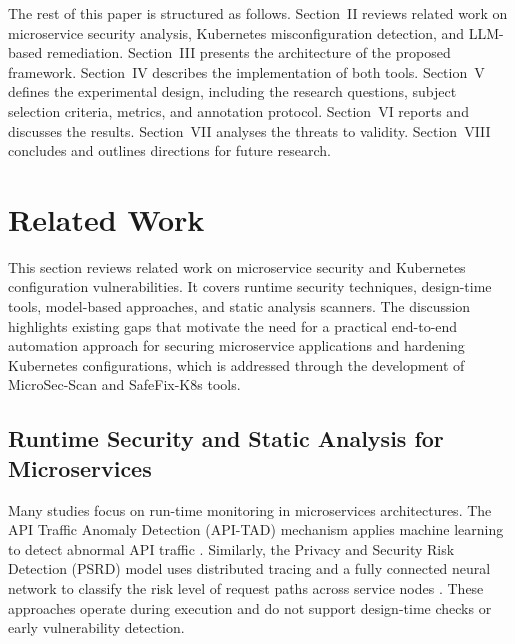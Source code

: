 \documentclass[preprint,12pt]{elsarticle}
\newcommand{\new}[1]{#1}
\begin{document}
\new{The rest of this paper is structured as follows. Section~II reviews related work on microservice security analysis, Kubernetes misconfiguration detection, and LLM-based remediation. Section~III presents the architecture of the proposed framework. Section~IV describes the implementation of both tools. Section~V defines the experimental design, including the research questions, subject selection criteria, metrics, and annotation protocol. Section~VI reports and discusses the results. Section~VII analyses the threats to validity. Section~VIII concludes and outlines directions for future research.}


















\section{Related Work}
\label{sec:lit_gap}

This section reviews related work on microservice security and Kubernetes configuration vulnerabilities. It covers runtime security techniques, design-time tools, model-based approaches, and static analysis scanners. The discussion highlights existing gaps that motivate the need for a practical end-to-end automation approach for securing microservice applications and hardening Kubernetes configurations, which is addressed through the development of MicroSec-Scan and SafeFix-K8s tools.



\subsection{Runtime Security and Static Analysis for Microservices}



Many studies focus on run-time monitoring in microservices architectures. The API Traffic Anomaly Detection (API-TAD) mechanism applies machine learning to detect abnormal API traffic \cite{sowmya2023apitad}. Similarly, the Privacy and Security Risk Detection (PSRD) model uses distributed tracing and a fully connected neural network to classify the risk level of request paths across service nodes \cite{chou2021}. These approaches operate during execution and do not support design-time checks or early vulnerability detection.
\end{document}
